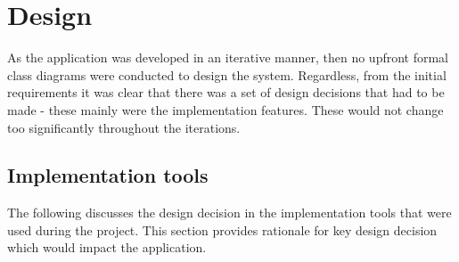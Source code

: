 \chapter{Design}




 


As the application was developed in an iterative manner, then no upfront formal class diagrams were conducted to design the system. Regardless, from the initial requirements it was clear that there was a set of design decisions that had to be made - these mainly were the implementation features. These would not change too significantly throughout the iterations.

\section{Implementation tools}
The following discusses the design decision in the implementation tools that were used during the project. This section provides rationale for key design decision which would impact the application.
